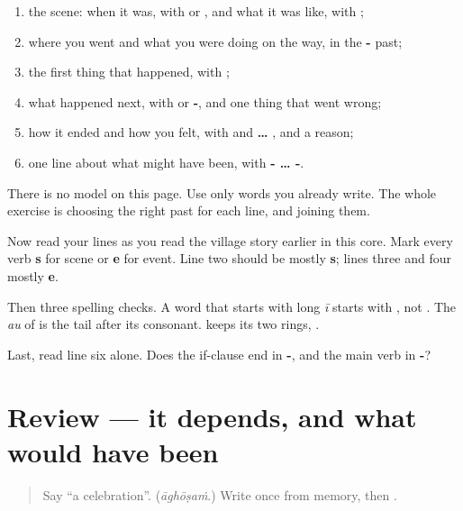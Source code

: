 \begin{enumerate}
\raggedright
  \item the scene: when it was, with \textbf{} or \textbf{}, and what it was like, with \textbf{};
  \item where you went and what you were doing on the way, in the \textbf{-} past;
  \item the first thing that happened, with \textbf{};
  \item what happened next, with \textbf{} or \textbf{-}, and one thing that went wrong;
  \item how it ended and how you felt, with \textbf{} and \textbf{ … }, and a reason;
  \item one line about what might have been, with \textbf{- … -}.
\end{enumerate}

There is no model on this page. Use only words you already write. The whole exercise is choosing the right past for each line, and joining them.

\begin{tcolorbox}[breakable,colback=teal!4,colframe=teal!35!black,title={Before you move on}]
Now read your lines as you read the village story earlier in this core. Mark every verb \textbf{s} for scene or \textbf{e} for event. Line two should be mostly \textbf{s}; lines three and four mostly \textbf{e}.

Then three spelling checks. A word that starts with long \emph{ī} starts with \textbf{}, not \textbf{}. The \emph{au} of \textbf{} is the tail \textbf{} after its consonant. \textbf{} keeps its two rings, \textbf{}.

Last, read line six alone. Does the if-clause end in \textbf{-}, and the main verb in \textbf{-}?
\end{tcolorbox}
\section[(review)]{Review — it depends, and what would have been}

\label{lesson:ML-R348-depends-and-would}



\begin{quote}
Say \textquotedblleft{}a celebration\textquotedblright{}. (\emph{āghōṣaṁ}.) Write \textbf{} once from memory, then \textbf{}.
\end{quote}


